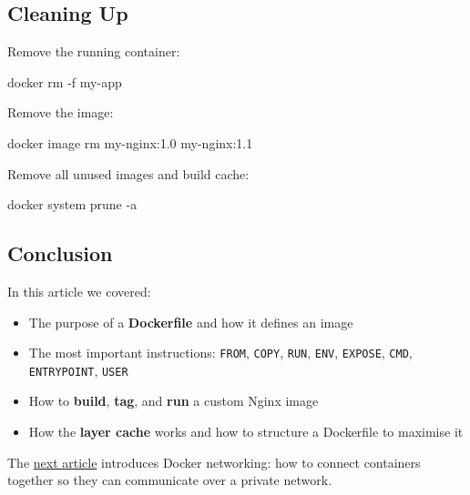 \documentclass[11pt,american,a4paper,openany]{book}
\providecommand{\tightlist}{%
  \setlength{\itemsep}{2pt}\setlength{\parskip}{0pt}}
\newenvironment{Shaded}{}{}
\newcommand{\NormalTok}[1]{#1}
\begin{document}
\subsection{Cleaning Up}\label{cleaning-up}

Remove the running container:

\begin{Shaded}
\begin{Highlighting}[]
\NormalTok{docker rm {-}f my{-}app}
\end{Highlighting}
\end{Shaded}

Remove the image:

\begin{Shaded}
\begin{Highlighting}[]
\NormalTok{docker image rm my{-}nginx:1.0 my{-}nginx:1.1}
\end{Highlighting}
\end{Shaded}

Remove all unused images and build cache:

\begin{Shaded}
\begin{Highlighting}[]
\NormalTok{docker system prune {-}a}
\end{Highlighting}
\end{Shaded}

\subsection{Conclusion}\label{conclusion-2}

In this article we covered:

\begin{itemize}
\tightlist
\item
  The purpose of a \textbf{Dockerfile} and how it defines an image
\item
  The most important instructions: \texttt{FROM}, \texttt{COPY},
  \texttt{RUN}, \texttt{ENV}, \texttt{EXPOSE}, \texttt{CMD},
  \texttt{ENTRYPOINT}, \texttt{USER}
\item
  How to \textbf{build}, \textbf{tag}, and \textbf{run} a custom Nginx
  image
\item
  How the \textbf{layer cache} works and how to structure a Dockerfile
  to maximise it
\end{itemize}

The
\href{/Users/sasadangelo/github.com/sasadangelo/code4projects/how-docker-networking-works-2025/}{next
article} introduces Docker networking: how to connect containers
together so they can communicate over a private network.
\end{document}
